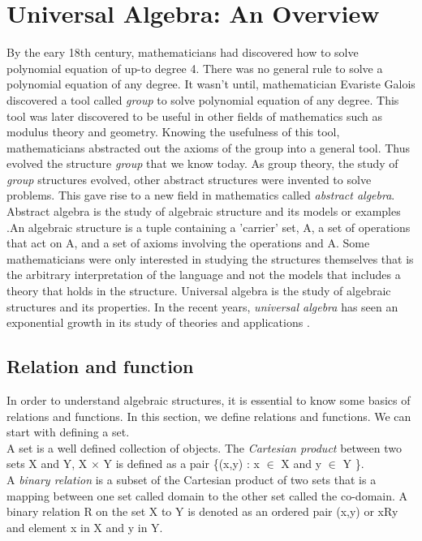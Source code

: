 \chapter{Universal Algebra: An Overview}

By the eary 18th century, mathematicians had discovered how to solve polynomial equation of up-to degree 4. There was no general rule to solve a polynomial equation of any degree. It wasn't until, mathematician Evariste Galois discovered a tool called \emph{group} to solve polynomial equation of any degree. This tool was later discovered to be useful in other fields of mathematics such as modulus theory and geometry\cite{enwiki:1107380309}. Knowing the usefulness of this tool, mathematicians abstracted out the axioms of the group into a general tool. Thus evolved the structure \emph{group} that we know today. As group theory, the study of \emph{group} structures evolved, other abstract structures were invented to solve problems. This gave rise to a new field in mathematics called \emph{abstract algebra}. Abstract algebra is the study of algebraic structure and its models or examples \cite{enwiki:1107380309}.An algebraic structure is a tuple containing a 'carrier' set, A, a set of operations that act on A, and a set of axioms involving the operations and A. Some mathematicians were only interested in studying the structures themselves that is the arbitrary interpretation of the language and not the models that includes a theory that holds in the structure. Universal algebra is the study of algebraic structures and its properties. In the recent years, \emph{universal algebra} has seen an exponential growth in its study of theories and applications \cite{sankappanavar1981course}. 

\section{Relation and function}
In order to understand algebraic structures, it is essential to know some basics of relations and functions. In this section, we define relations and functions. We can start with defining a set. \\

A set is a well defined collection of objects. The \emph{Cartesian product} between two sets X and Y,  X \(\times\) Y is defined as a pair \{(x,y) : x \(\in\) X and y \(\in\) Y \}. \\

A \emph{binary relation} is a subset of the Cartesian product of two sets that is a mapping between one set called domain to the other set called the co-domain. A binary relation R on the set X to Y is denoted as an ordered pair (x,y) or xRy and element x in X and y in Y. \\


